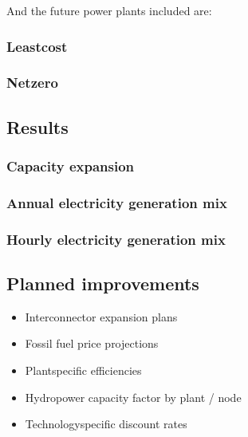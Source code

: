 \documentclass[a4paper,11pt,english]{sphinxmanual}
\begin{document}
\sphinxAtStartPar
And the future power plants included are:


\subsubsection{Least\sphinxhyphen{}cost}
\label{\detokenize{1_indonesia:least-cost}}

\subsubsection{Net\sphinxhyphen{}zero}
\label{\detokenize{1_indonesia:net-zero}}

\subsection{Results}
\label{\detokenize{1_indonesia:results}}

\subsubsection{Capacity expansion}
\label{\detokenize{1_indonesia:capacity-expansion}}



\subsubsection{Annual electricity generation mix}
\label{\detokenize{1_indonesia:annual-electricity-generation-mix}}



\subsubsection{Hourly electricity generation mix}
\label{\detokenize{1_indonesia:hourly-electricity-generation-mix}}



\subsection{Planned improvements}
\label{\detokenize{1_indonesia:planned-improvements}}\begin{itemize}
\item {} 
\sphinxAtStartPar
Interconnector expansion plans

\item {} 
\sphinxAtStartPar
Fossil fuel price projections

\item {} 
\sphinxAtStartPar
Plant\sphinxhyphen{}specific efficiencies

\item {} 
\sphinxAtStartPar
Hydropower capacity factor by plant / node

\item {} 
\sphinxAtStartPar
Technology\sphinxhyphen{}specific discount rates

\end{itemize}
\end{document}
